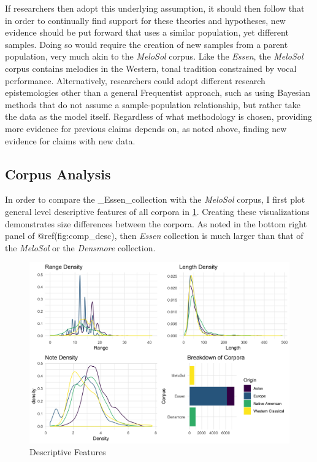 \documentclass[]{book}
\begin{document}
If researchers then adopt this underlying assumption, it should then follow that in order to continually find support for these theories and hypotheses, new evidence should be put forward that uses a similar population, yet different samples.
Doing so would require the creation of new samples from a parent population, very much akin to the \emph{MeloSol} corpus.
Like the \emph{Essen}, the \emph{MeloSol} corpus contains melodies in the Western, tonal tradition constrained by vocal performance.
Alternatively, researchers could adopt different research epistemologies other than a general Frequentist approach, such as using Bayesian methods that do not assume a sample-population relationship, but rather take the data as the model itself.
Regardless of what methodology is chosen, providing more evidence for previous claims depends on, as noted above, finding new evidence for claims with new data.

\hypertarget{corpus-analysis-1}{%
\subsection{Corpus Analysis}\label{corpus-analysis-1}}

In order to compare the \_Essen\_collection with the \emph{MeloSol} corpus, I first plot general level descriptive features of all corpora in \ref{fig:compdesc}.
Creating these visualizations demonstrates size differences between the corpora.
As noted in the bottom right panel of @ref(fig:comp\_desc), then \emph{Essen} collection is much larger than that of the \emph{MeloSol} or the \emph{Densmore} collection.

\begin{figure}

{\centering \includegraphics[width=1\linewidth]{img/comparative_descritive_panel} 

}

\caption{Descriptive Features}\label{fig:compdesc}
\end{figure}
\end{document}
